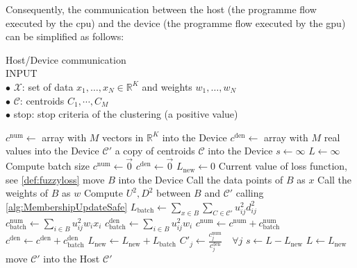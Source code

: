 \begin{toReview}
	\noindent Consequently, the communication between the host (the programme flow executed by the \gls{cpu}) and the device (the programme flow executed by the \gls{gpu}) can be simplified as follows:

	\begin{algorithm}[H]
		\caption{Host/Device communication\\
			\textsc{INPUT}\\
			$\bullet$ $\mathcal{X}$: set of data $x_1,\ldots,x_N\in\mathbb{R}^K$ and weights $w_1,\ldots,w_N$\\
			$\bullet$ $\mathcal{C}$: centroids $C_1,\cdots,C_M$\\
			$\bullet$ stop: stop criteria of the clustering (a positive value)
		}
		\begin{algorithmic}[1]
				\State $c^\text{num} \gets $ array with $M$ vectors in $\mathbb{R}^K$ into the Device
				\State $c^\text{den} \gets $ array with $M$ real values into the Device
				\State $\mathcal{C}'$ a copy of centroids $\mathcal{C}$ into the Device
				\State $s \gets \infty$
				\State $L \gets \infty$
					\State Compute batch size
					\State $c^\text{num}\gets \vec{0}$
					\State $c^\text{den}\gets \vec{0}$
					\State $L_\text{new} \gets 0$ \Comment Current value of loss function, see \cref{def:fuzzyloss}
						\State move $B$ into the Device
						\State Call the data points of $B$ as $x$
						\State Call the weights of $B$ as $w$
						\State Compute $U^2, D^2$ between $B$ and $\mathcal{C}'$ \Comment calling \cref{alg:MembershipUpdateSafe}
						\State $L_\text{batch} \gets \sum_{x\in B}\sum_{C\in\mathcal{C'}}u_{ij}^2d_{ij}^2$
						\State $c^\text{num}_\text{batch} \gets \sum_{i\in B} u_{ij}^2w_ix_i$
						\State $c^\text{den}_\text{batch} \gets \sum_{i\in B} u_{ij}^2w_i$
						\State $c^\text{num} \gets c^\text{num} + c^\text{num}_\text{batch}$
						\State $c^\text{den} \gets c^\text{den} + c^\text{den}_\text{batch}$
						\State $L_\text{new} \gets L_\text{new} + L_\text{batch}$
					\EndFor
					\State $C'_j \gets \frac{c^\text{num}_j}{ c^\text{den}_j} \quad \forall j$
					\State $s \gets L - L_\text{new}$
					\State $L \gets L_\text{new}$
				\EndWhile
				\State move $\mathcal{C}'$ into the Host
				\State \Return $\mathcal{C}'$
			\EndFunction
			\label{alg:FCMwrapper}
		\end{algorithmic}
	\end{algorithm}


\end{toReview}
